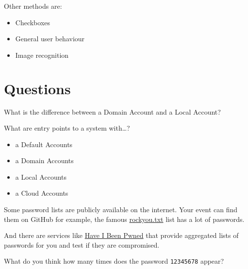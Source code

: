 Other methods are:
\begin{itemize}
    \item Checkboxes
    \item General user behaviour
    \item Image recognition
\end{itemize}

\chapter{Questions}
\begin{question}[Question]
    What is the difference between a Domain Account and a Local Account?
\end{question}
\begin{question}[Answer]
    \vspace{3cm}
\end{question}
\begin{question}[Question]
    What are entry points to a system with\dots?
    \begin{itemize}
        \item a Default Accounts
        \item a Domain Accounts
        \item a Local Accounts
        \item a Cloud Accounts
    \end{itemize}
\end{question}
\begin{question}[Answer]
    \vspace{6cm}
\end{question}

\begin{question}[Question]
    Some password lists are publicly available on the internet.
    Your event can find them on GitHub for example, the famous \href{https://github.com/brannondorsey/naive-hashcat/releases/tag/data}{rockyou.txt} list has a lot of passwords.

    And there are services like \href{https://haveibeenpwned.com/Passwords}{Have I Been Pwned} that provide aggregated lists of passwords for you and test if they are compromised.

    What do you think how many times does the password \lstinline{12345678} appear?
\end{question}
\begin{question}[Answer]
    \vspace{3cm}
\end{question}
